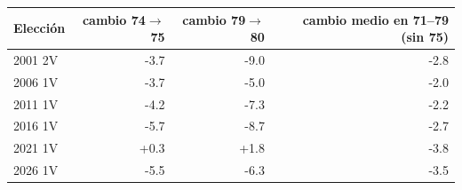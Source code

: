 \begin{tabular}{lrrr}
\toprule
Elección & cambio 74$\to$75 & cambio 79$\to$80 & cambio medio en 71--79 (sin 75) \\
\midrule
2001 2V & -3.7 & -9.0 & -2.8 \\
2006 1V & -3.7 & -5.0 & -2.0 \\
2011 1V & -4.2 & -7.3 & -2.2 \\
2016 1V & -5.7 & -8.7 & -2.7 \\
2021 1V & +0.3 & +1.8 & -3.8 \\
2026 1V & -5.5 & -6.3 & -3.5 \\
\bottomrule
\end{tabular}